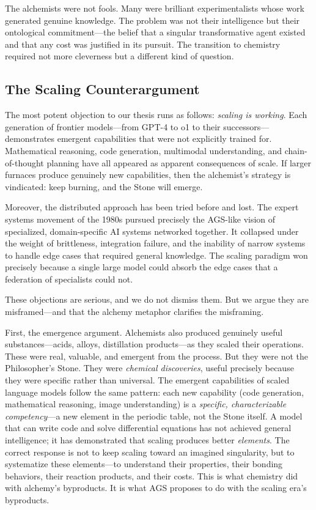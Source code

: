 \documentclass[12pt]{article}
\begin{document}
The alchemists were not fools. Many were brilliant experimentalists whose work generated genuine knowledge. The problem was not their intelligence but their ontological commitment---the belief that a singular transformative agent existed and that any cost was justified in its pursuit. The transition to chemistry required not more cleverness but a different kind of question.

\subsection{The Scaling Counterargument}
\label{sec:scaling}

The most potent objection to our thesis runs as follows: \emph{scaling is working}. Each generation of frontier models---from GPT-4 to o1 to their successors---demonstrates emergent capabilities that were not explicitly trained for. Mathematical reasoning, code generation, multimodal understanding, and chain-of-thought planning have all appeared as apparent consequences of scale. If larger furnaces produce genuinely new capabilities, then the alchemist's strategy is vindicated: keep burning, and the Stone will emerge.

Moreover, the distributed approach has been tried before and lost. The expert systems movement of the 1980s pursued precisely the AGS-like vision of specialized, domain-specific AI systems networked together. It collapsed under the weight of brittleness, integration failure, and the inability of narrow systems to handle edge cases that required general knowledge. The scaling paradigm won precisely because a single large model could absorb the edge cases that a federation of specialists could not.

These objections are serious, and we do not dismiss them. But we argue they are misframed---and that the alchemy metaphor clarifies the misframing.

First, the emergence argument. Alchemists also produced genuinely useful substances---acids, alloys, distillation products---as they scaled their operations. These were real, valuable, and emergent from the process. But they were not the Philosopher's Stone. They were \emph{chemical discoveries}, useful precisely because they were specific rather than universal. The emergent capabilities of scaled language models follow the same pattern: each new capability (code generation, mathematical reasoning, image understanding) is a \emph{specific, characterizable competency}---a new element in the periodic table, not the Stone itself. A model that can write code and solve differential equations has not achieved general intelligence; it has demonstrated that scaling produces better \emph{elements}. The correct response is not to keep scaling toward an imagined singularity, but to systematize these elements---to understand their properties, their bonding behaviors, their reaction products, and their costs. This is what chemistry did with alchemy's byproducts. It is what AGS proposes to do with the scaling era's byproducts.
\end{document}
